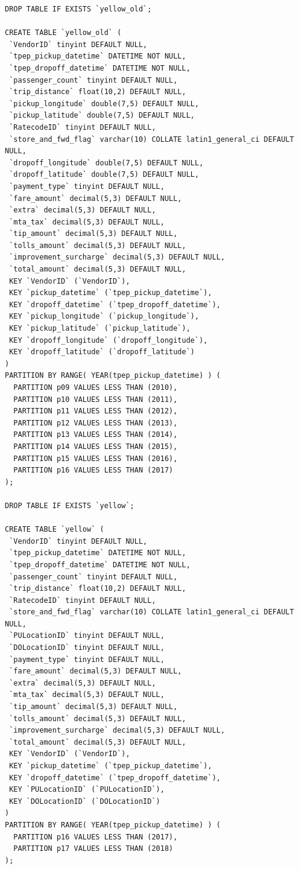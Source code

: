 \documentclass[12pt,twoside]{reedthesis}
\theoremstyle{definition}
\theoremstyle{definition}
\theoremstyle{definition}
\theoremstyle{remark}
\begin{document}
\begin{verbatim}
DROP TABLE IF EXISTS `yellow_old`;

CREATE TABLE `yellow_old` (
 `VendorID` tinyint DEFAULT NULL,
 `tpep_pickup_datetime` DATETIME NOT NULL,
 `tpep_dropoff_datetime` DATETIME NOT NULL,
 `passenger_count` tinyint DEFAULT NULL,
 `trip_distance` float(10,2) DEFAULT NULL,
 `pickup_longitude` double(7,5) DEFAULT NULL,
 `pickup_latitude` double(7,5) DEFAULT NULL,
 `RatecodeID` tinyint DEFAULT NULL,
 `store_and_fwd_flag` varchar(10) COLLATE latin1_general_ci DEFAULT NULL,
 `dropoff_longitude` double(7,5) DEFAULT NULL,
 `dropoff_latitude` double(7,5) DEFAULT NULL,
 `payment_type` tinyint DEFAULT NULL,
 `fare_amount` decimal(5,3) DEFAULT NULL,
 `extra` decimal(5,3) DEFAULT NULL,
 `mta_tax` decimal(5,3) DEFAULT NULL,
 `tip_amount` decimal(5,3) DEFAULT NULL,
 `tolls_amount` decimal(5,3) DEFAULT NULL,
 `improvement_surcharge` decimal(5,3) DEFAULT NULL,
 `total_amount` decimal(5,3) DEFAULT NULL,
 KEY `VendorID` (`VendorID`),
 KEY `pickup_datetime` (`tpep_pickup_datetime`),
 KEY `dropoff_datetime` (`tpep_dropoff_datetime`),
 KEY `pickup_longitude` (`pickup_longitude`),
 KEY `pickup_latitude` (`pickup_latitude`),
 KEY `dropoff_longitude` (`dropoff_longitude`),
 KEY `dropoff_latitude` (`dropoff_latitude`)
)
PARTITION BY RANGE( YEAR(tpep_pickup_datetime) ) (
  PARTITION p09 VALUES LESS THAN (2010),
  PARTITION p10 VALUES LESS THAN (2011),
  PARTITION p11 VALUES LESS THAN (2012),
  PARTITION p12 VALUES LESS THAN (2013),
  PARTITION p13 VALUES LESS THAN (2014),
  PARTITION p14 VALUES LESS THAN (2015),
  PARTITION p15 VALUES LESS THAN (2016),
  PARTITION p16 VALUES LESS THAN (2017)
);

DROP TABLE IF EXISTS `yellow`;

CREATE TABLE `yellow` (
 `VendorID` tinyint DEFAULT NULL,
 `tpep_pickup_datetime` DATETIME NOT NULL,
 `tpep_dropoff_datetime` DATETIME NOT NULL,
 `passenger_count` tinyint DEFAULT NULL,
 `trip_distance` float(10,2) DEFAULT NULL,
 `RatecodeID` tinyint DEFAULT NULL,
 `store_and_fwd_flag` varchar(10) COLLATE latin1_general_ci DEFAULT NULL,
 `PULocationID` tinyint DEFAULT NULL,
 `DOLocationID` tinyint DEFAULT NULL,
 `payment_type` tinyint DEFAULT NULL,
 `fare_amount` decimal(5,3) DEFAULT NULL,
 `extra` decimal(5,3) DEFAULT NULL,
 `mta_tax` decimal(5,3) DEFAULT NULL,
 `tip_amount` decimal(5,3) DEFAULT NULL,
 `tolls_amount` decimal(5,3) DEFAULT NULL,
 `improvement_surcharge` decimal(5,3) DEFAULT NULL,
 `total_amount` decimal(5,3) DEFAULT NULL,
 KEY `VendorID` (`VendorID`),
 KEY `pickup_datetime` (`tpep_pickup_datetime`),
 KEY `dropoff_datetime` (`tpep_dropoff_datetime`),
 KEY `PULocationID` (`PULocationID`),
 KEY `DOLocationID` (`DOLocationID`)
)
PARTITION BY RANGE( YEAR(tpep_pickup_datetime) ) (
  PARTITION p16 VALUES LESS THAN (2017),
  PARTITION p17 VALUES LESS THAN (2018)
);



\end{verbatim}
\end{document}
